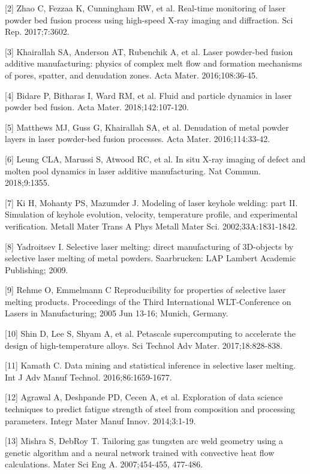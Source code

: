 \documentclass[10pt]{article}
\begin{document}
[2] Zhao C, Fezzaa K, Cunningham RW, et al. Real-time monitoring of laser powder bed fusion process using high-speed X-ray imaging and diffraction. Sci Rep. 2017;7:3602.

[3] Khairallah SA, Anderson AT, Rubenchik A, et al. Laser powder-bed fusion additive manufacturing: physics of complex melt flow and formation mechanisms of pores, spatter, and denudation zones. Acta Mater. 2016;108:36-45.

[4] Bidare P, Bitharas I, Ward RM, et al. Fluid and particle dynamics in laser powder bed fusion. Acta Mater. 2018;142:107-120.

[5] Matthews MJ, Guss G, Khairallah SA, et al. Denudation of metal powder layers in laser powder-bed fusion processes. Acta Mater. 2016;114:33-42.

[6] Leung CLA, Marussi S, Atwood RC, et al. In situ X-ray imaging of defect and molten pool dynamics in laser additive manufacturing. Nat Commun. 2018;9:1355.

[7] Ki H, Mohanty PS, Mazumder J. Modeling of laser keyhole welding: part II. Simulation of keyhole evolution, velocity, temperature profile, and experimental verification. Metall Mater Trans A Phys Metall Mater Sci. 2002;33A:1831-1842.

[8] Yadroitsev I. Selective laser melting: direct manufacturing of 3D-objects by selective laser melting of metal powders. Saarbrucken: LAP Lambert Academic Publishing; 2009.

[9] Rehme O, Emmelmann C Reproducibility for properties of selective laser melting products. Proceedings of the Third International WLT-Conference on Lasers in Manufacturing; 2005 Jun 13-16; Munich, Germany.

[10] Shin D, Lee S, Shyam A, et al. Petascale supercomputing to accelerate the design of high-temperature alloys. Sci Technol Adv Mater. 2017;18:828-838.

[11] Kamath C. Data mining and statistical inference in selective laser melting. Int J Adv Manuf Technol. 2016;86:1659-1677.

[12] Agrawal A, Deshpande PD, Cecen A, et al. Exploration of data science techniques to predict fatigue strength of steel from composition and processing parameters. Integr Mater Manuf Innov. 2014;3:1-19.

[13] Mishra S, DebRoy T. Tailoring gas tungsten arc weld geometry using a genetic algorithm and a neural network trained with convective heat flow calculations. Mater Sci Eng A. 2007;454-455, 477-486.
\end{document}

